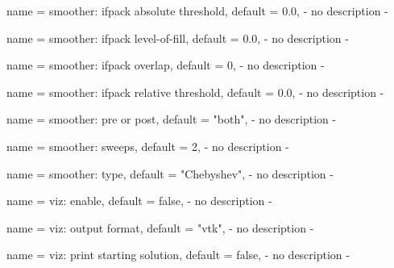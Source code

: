 \begin{parameter}{
    name    = {smoother: ifpack absolute threshold},
    default = {0.0},
}
- no description -
\end{parameter}

\begin{parameter}{
    name    = {smoother: ifpack level-of-fill},
    default = {0.0},
}
- no description -
\end{parameter}

\begin{parameter}{
    name    = {smoother: ifpack overlap},
    default = {0},
}
- no description -
\end{parameter}

\begin{parameter}{
    name    = {smoother: ifpack relative threshold},
    default = {0.0},
}
- no description -
\end{parameter}

\begin{parameter}{
    name    = {smoother: pre or post},
    default = {"both"},
}
- no description -
\end{parameter}

\begin{parameter}{
    name    = {smoother: sweeps},
    default = {2},
}
- no description -
\end{parameter}

\begin{parameter}{
    name    = {smoother: type},
    default = {"Chebyshev"},
}
- no description -
\end{parameter}

\begin{parameter}{
    name    = {viz: enable},
    default = {false},
}
- no description -
\end{parameter}

\begin{parameter}{
    name    = {viz: output format},
    default = {"vtk"},
}
- no description -
\end{parameter}

\begin{parameter}{
    name    = {viz: print starting solution},
    default = {false},
}
- no description -
\end{parameter}

